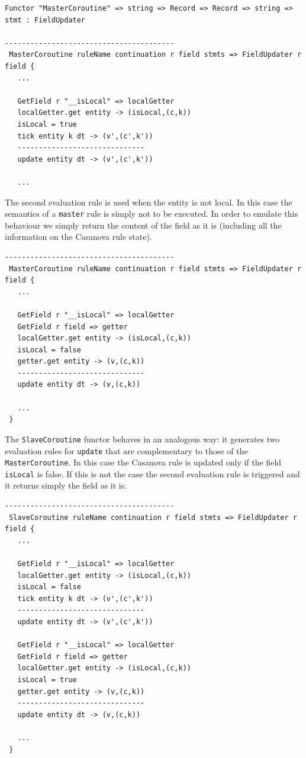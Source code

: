 \begin{lstlisting}
Functor "MasterCoroutine" => string => Record => Record => string => stmt : FieldUpdater

----------------------------------------
 MasterCoroutine ruleName continuation r field stmts => FieldUpdater r field {
   ...
   
   GetField r "__isLocal" => localGetter
   localGetter.get entity -> (isLocal,(c,k))
   isLocal = true
   tick entity k dt -> (v',(c',k'))
   ------------------------------
   update entity dt -> (v',(c',k'))
   
   ...
\end{lstlisting}

\noindent
The second evaluation rule is used when the entity is not local. In this case the semantics of a \texttt{master} rule is simply not to be executed. In order to emulate this behaviour we simply return the content of the field as it is (including all the information on the Casanova rule state).
\begin{lstlisting}
----------------------------------------
 MasterCoroutine ruleName continuation r field stmts => FieldUpdater r field {
   ...
   
   GetField r "__isLocal" => localGetter
   GetField r field => getter
   localGetter.get entity -> (isLocal,(c,k))
   isLocal = false
   getter.get entity -> (v,(c,k))
   ------------------------------
   update entity dt -> (v,(c,k))
   
   ...
 }
\end{lstlisting}

\noindent
The \texttt{SlaveCoroutine} functor behaves in an analogous way: it generates two evaluation rules for \texttt{update} that are complementary to those of the \texttt{MasterCoroutine}. In this case the Casanova rule is updated only if the field \texttt{\tu\tu isLocal} is false. If this is not the case the second evaluation rule is triggered and it returns simply the field as it is.

\begin{lstlisting}
----------------------------------------
 SlaveCoroutine ruleName continuation r field stmts => FieldUpdater r field {
   ...

   GetField r "__isLocal" => localGetter
   localGetter.get entity -> (isLocal,(c,k))
   isLocal = false
   tick entity k dt -> (v',(c',k'))
   ------------------------------
   update entity dt -> (v',(c',k'))

   GetField r "__isLocal" => localGetter
   GetField r field => getter
   localGetter.get entity -> (isLocal,(c,k))
   isLocal = true
   getter.get entity -> (v,(c,k))
   ------------------------------
   update entity dt -> (v,(c,k))
   
   ... 
 }
\end{lstlisting}

